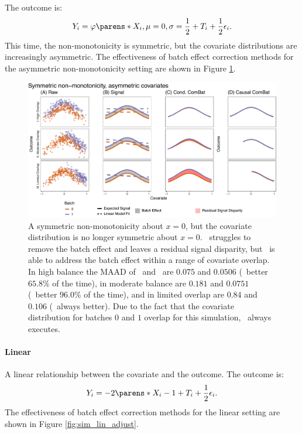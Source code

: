 {{{{The outcome is:
\begin{align*}
    Y_i = \varphi\parens*{X_i, \mu=0, \sigma=\frac{1}{2}} + T_i + \frac{1}{2}\epsilon_i.
\end{align*}
This time, the non-monotonicity is symmetric, but the covariate distributions are increasingly asymmetric. The effectiveness of batch effect correction methods for the asymmetric non-monotonicity setting are shown in Figure \ref{fig:sim_nlin_adjust_nm_sym_asy}.

\begin{figure}[h]
    \centering
    \includegraphics[width=\linewidth]{Figures/Supplement/Simulations/sim_nlin_adjust_nm_sym_asy.pdf}
    \caption{A symmetric non-monotonicity about $x=0$, but the covariate distribution is no longer symmetric about $x=0$. \ccombat~struggles to remove the batch effect and leaves a residual signal disparity, but \cccombat~is able to address the batch effect within a range of covariate overlap. In high balance the MAAD of \ccombat~and \cccombat~are $0.075$ and $0.0506$ (\cccombat~better $65.8\%$ of the time), in moderate balance are $0.181$ and $0.0751$ (\cccombat~better $96.0\%$ of the time), and in limited overlap are $0.84$ and $0.106$ (\cccombat~always better). Due to the fact that the covariate distribution for batches $0$ and $1$ overlap for this simulation, \cccombat~always executes.}
    \label{fig:sim_nlin_adjust_nm_sym_asy}
\end{figure}


\paragraph*{Linear} A linear relationship between the covariate and the outcome. The outcome is:
\begin{align*}
    Y_i = -2\parens*{X_i - 1} + T_i + \frac{1}{2}\epsilon_i.
\end{align*} The effectiveness of batch effect correction methods for the linear setting are shown in Figure \ref{fig:sim_lin_adjust}.

}}}}
